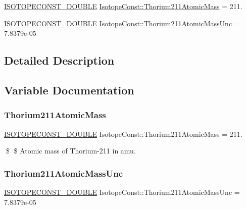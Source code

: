 \begin{DoxyCompactItemize}
\item 
\mbox{\hyperlink{group___isotope_const-_macros_ga8f45a7272ce02c0b4c65c44636ed719a}{I\+S\+O\+T\+O\+P\+E\+C\+O\+N\+S\+T\+\_\+\+D\+O\+U\+B\+LE}} \mbox{\hyperlink{group___isotope_const-_thorium-_th211_gac08e8f794cadf923bb3654acabdc408b}{Isotope\+Const\+::\+Thorium211\+Atomic\+Mass}} = 211.
\item 
\mbox{\hyperlink{group___isotope_const-_macros_ga8f45a7272ce02c0b4c65c44636ed719a}{I\+S\+O\+T\+O\+P\+E\+C\+O\+N\+S\+T\+\_\+\+D\+O\+U\+B\+LE}} \mbox{\hyperlink{group___isotope_const-_thorium-_th211_ga5678c55d8c94ac2bca9a80de6d50aca5}{Isotope\+Const\+::\+Thorium211\+Atomic\+Mass\+Unc}} = 7.\+8379e-\/05
\end{DoxyCompactItemize}


\subsection{Detailed Description}


\subsection{Variable Documentation}
\mbox{\label{group___isotope_const-_thorium-_th211_gac08e8f794cadf923bb3654acabdc408b}} 
\subsubsection{\texorpdfstring{Thorium211\+Atomic\+Mass}{Thorium211AtomicMass}}
{\footnotesize\ttfamily \mbox{\hyperlink{group___isotope_const-_macros_ga8f45a7272ce02c0b4c65c44636ed719a}{I\+S\+O\+T\+O\+P\+E\+C\+O\+N\+S\+T\+\_\+\+D\+O\+U\+B\+LE}} Isotope\+Const\+::\+Thorium211\+Atomic\+Mass = 211.}

\$ \$ Atomic mass of Thorium-\/211 in amu. \mbox{\label{group___isotope_const-_thorium-_th211_ga5678c55d8c94ac2bca9a80de6d50aca5}} 
\subsubsection{\texorpdfstring{Thorium211\+Atomic\+Mass\+Unc}{Thorium211AtomicMassUnc}}
{\footnotesize\ttfamily \mbox{\hyperlink{group___isotope_const-_macros_ga8f45a7272ce02c0b4c65c44636ed719a}{I\+S\+O\+T\+O\+P\+E\+C\+O\+N\+S\+T\+\_\+\+D\+O\+U\+B\+LE}} Isotope\+Const\+::\+Thorium211\+Atomic\+Mass\+Unc = 7.\+8379e-\/05}

